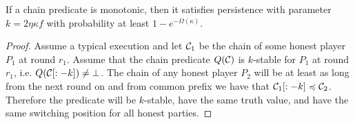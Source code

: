 \begin{theorem}
    If a chain predicate is monotonic, then it satisfies persistence with
    parameter $k = 2\eta \kappa f$ with probability at least $1 -
    e^{-\Omega(\kappa)}$.
\end{theorem}

\begin{proof}
    Assume a typical execution and let $\mathcal{C}_1$ be the chain of some honest
    player $P_1$ at round $r_1$. Assume that the chain predicate $Q(\mathcal{C})$ is
    $k$-stable for $P_1$ at round $r_1$, i.e.  $Q(\mathcal{C}[:-k]) \neq \bot$.
    The chain of any honest player $P_2$ will be at least as long from the next
    round on and from common prefix we have that $\mathcal{C}_1[:-k]
    \preccurlyeq \mathcal{C}_2$. Therefore the predicate will be $k$-stable, have
    the same truth value, and have the same switching position for all honest
    parties.
\end{proof}

